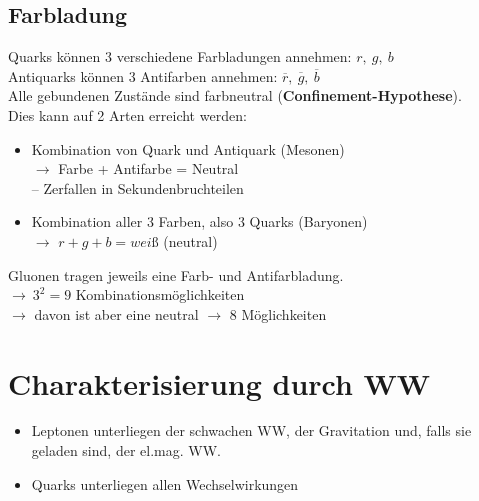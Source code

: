 \documentclass[Ex4_Zusammenfassung.tex]{subfiles}
\begin{document}
\subsection*{Farbladung}
Quarks können 3 verschiedene Farbladungen annehmen: $r,\ g,\ b$\\
Antiquarks können 3 Antifarben annehmen: $\overline{r},\ \overline{g},\ \overline{b}$\\

Alle gebundenen Zustände sind farbneutral (\textbf{Confinement-Hypothese}).\\
Dies kann auf 2 Arten erreicht werden:
\begin{itemize}
	\item Kombination von Quark und Antiquark (Mesonen)\\
	$\rightarrow$ Farbe + Antifarbe = Neutral\\
	\quad -- Zerfallen in Sekundenbruchteilen
	\item Kombination aller 3 Farben, also 3 Quarks (Baryonen)\\
	$\rightarrow$ $r+g+b=weiß$ (neutral)
\end{itemize}

Gluonen tragen jeweils eine Farb- und Antifarbladung.\\
$\rightarrow\ 3^2 = 9$ Kombinationsmöglichkeiten\\
$\rightarrow$ davon ist aber eine neutral $\rightarrow$ 8 Möglichkeiten

\section{Charakterisierung durch WW}
\begin{itemize}
	\item Leptonen unterliegen der schwachen WW, der Gravitation und, falls sie geladen sind, der el.mag. WW.
	\item Quarks unterliegen allen Wechselwirkungen
\end{itemize}
\end{document}

